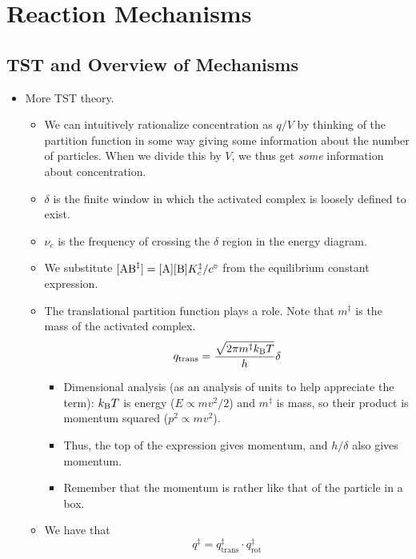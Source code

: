 \documentclass[../notes.tex]{subfiles}
\begin{document}
\chapter{Reaction Mechanisms}
\section{TST and Overview of Mechanisms}
\begin{itemize}
    \item {}More TST theory.
    \begin{itemize}
        \item We can intuitively rationalize concentration as $q/V$ by thinking of the partition function in some way giving some information about the number of particles. When we divide this by $V$, we thus get \emph{some} information about concentration.
        \item $\delta$ is the finite window in which the activated complex is loosely defined to exist.
        \item $\nu_c$ is the frequency of crossing the $\delta$ region in the energy diagram.
        \item We substitute $[\ce{AB}^\ddagger]=[\ce{A}][\ce{B}]K_c^\ddagger/c^\circ$ from the equilibrium constant expression.
        \item The translational partition function plays a role. Note that $m^\ddagger$ is the mass of the activated complex.
        \begin{equation*}
            q_\text{trans} = \frac{\sqrt{2\pi m^\ddagger k_\text{B} T}}{h}\delta
        \end{equation*}
        \begin{itemize}
            \item Dimensional analysis (as an analysis of units to help appreciate the term): $k_\text{B} T$ is energy ($E\propto mv^2/2$) and $m^\ddagger$ is mass, so their product is momentum squared ($p^2\propto mv^2$).
            \item Thus, the top of the expression gives momentum, and $h/\delta$ also gives momentum.
            \item Remember that the momentum is rather like that of the particle in a box.
        \end{itemize}
        \item We have that
        \begin{equation*}
            q^\ddagger = q_\text{trans}^\ddagger\cdot q_\text{rot}^\ddagger
        \end{equation*}

\end{itemize}
\end{itemize}
\end{document}
